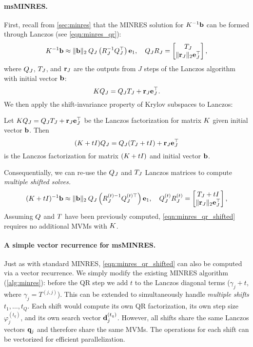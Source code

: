 \paragraph{msMINRES.}
First, recall from \cref{sec:minres} that the MINRES solution for $K^{-1} \mathbf{b}$ can be formed through Lanczos (see \cref{eqn:minres_qr}):
\begin{equation}
  K^{-1} \mathbf{b} \approx \Vert \mathbf{b} \Vert_2 \: Q_J \left( R^{-1}_J Q_J^\top \right) \mathbf{e}_1,
  \quad
  Q_J R_J = \begin{bmatrix} T_J \\ \Vert \mathbf{r}_J \Vert_2 \mathbf{e}_J^\top \end{bmatrix},
  \label{eqn:minres_qr2}
\end{equation}
where $Q_J$, $T_J$, and $\mathbf{r}_J$ are the outputs from $J$ steps of the Lanczos algorithm with initial vector $\mathbf{b}$:
\[
  K Q_J = Q_J T_J + \mathbf{r}_J \mathbf{e}_J^\top.
\]
We then apply the shift-invariance property of Krylov subspaces to Lanczos:
%
\begin{observation}
  Let $K Q_J = Q_J T_J + \mathbf{r}_J \mathbf{e}_J^\top$ be the Lanczos factorization for matrix $K$ given initial vector $\mathbf{b}$.
  Then $$(K + t I) Q_J = Q_J (T_J + t I) + \mathbf{r}_J \mathbf{e}_J^\top$$ is the Lanczos factorization for matrix $(K + t I)$ and initial vector $\mathbf{b}$.
\end{observation}
%
\noindent
Consequentially, we can re-use the $Q_J$ and $T_J$ Lanczos matrices to compute \emph{multiple shifted solves.}
%
\begin{equation}
  (K + t I)^{-1} \mathbf{b} \approx \Vert \mathbf{b} \Vert_2 \: Q_J \left( R^{(t){-1}}_J Q_J^{(t)\top} \right) \mathbf{e}_1,
  \quad
  Q_J^{(t)} R_J^{(t)} = \begin{bmatrix} T_J + t I \\ \Vert \mathbf{r}_J \Vert_2 \mathbf{e}_J^\top \end{bmatrix},
  \label{eqn:minres_qr_shifted}
\end{equation}
%
Assuming $Q$ and $T$ have been previously computed, \cref{eqn:minres_qr_shifted} requires no additional MVMs with $K$.




\paragraph{A simple vector recurrence for msMINRES.}
Just as with standard MINRES, \cref{eqn:minres_qr_shifted} can also be computed via a vector recurrence.
We simply modify the existing MINRES algorithm (\cref{alg:minres}): before the QR step we add $t$ to the Lanczos diagonal terms ($\gamma_j + t$, where $\gamma_j = T^{(j,j)}$).
This can be extended to simultaneously handle \emph{multiple shifts} $t_1, \ldots, t_Q$.
Each shift would compute its own QR factorization, its own step size $\varphi_j^{(t_q)}$, and its own search vector $\mathbf{d}_j^{(t_q)}$.
However, all shifts share the same Lanczos vectors $\mathbf{q}_j$ and therefore share the same MVMs.
The operations for each shift can be vectorized for efficient parallelization.

